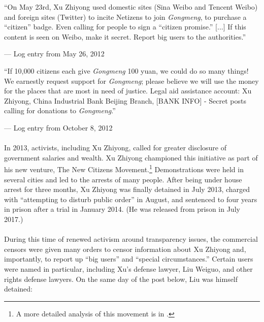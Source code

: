 \documentclass[12pt]{article}
\begin{document}
\begin{CJK*}{UTF8}{gbsn}
{
\epigraph{``On May 23rd, Xu Zhiyong used domestic sites (Sina Weibo and Tencent Weibo) and foreign sites (Twitter)  to incite Netizens to join {\it Gongmeng}, to purchase a ``citizen'' badge. Even calling for people to sign a ``citizen promise.'' [...] If this content is seen on Weibo, make it secret. Report big users to the authorities.''\footnotemark\newline}{--- Log entry from May 26, 2012}}

{
\epigraph{``If 10,000 citizens each give {\it Gongmeng} 100 yuan, we could do so many things! We earnestly request support for {\it Gongmeng}; please believe we will use the money for the places that are most in need of justice. Legal aid assistance account: Xu Zhiyong, China Industrial Bank Beijing Branch, [BANK INFO] - Secret posts calling for donations to {\it Gongmeng}.''\footnotemark\newline}{--- Log entry from October 8, 2012}}
\paragraph{} In 2013, activists, including Xu Zhiyong, called for greater disclosure of government salaries and wealth. Xu Zhiyong championed this initiative as part of his new venture, The New Citizens Movement.\footnote{A more detailed analysis of this movement is in \cite{pils2014china}.} Demonstrations were held in several cities and led to the arrests of many people. After being under house arrest for three months, Xu Zhiyong was finally detained in July 2013, charged with ``attempting to disturb public order'' in August, and sentenced to four years in prison after a trial in January 2014. (He was released from prison in July 2017.)
\paragraph{} During this time of renewed activism around transparency issues, the commercial censors were given many orders to censor information about Xu Zhiyong and, importantly, to report up ``big users'' and ``special circumstances.'' Certain users were named in particular, including Xu's defense lawyer, Liu Weiguo, and other rights defense lawyers. On the same day of the post below, Liu was himself detained:


\end{CJK*}
\end{document}
